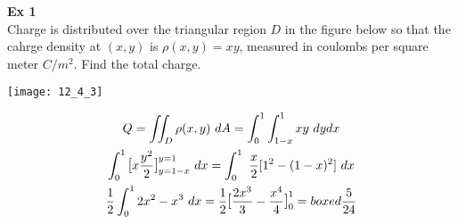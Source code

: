 \documentclass{article}
\begin{document}
   \textbf{Ex 1}\\
   Charge is distributed over the triangular region $ D $ in the figure below so that the cahrge density at $ (x,y) $ is $ \rho(x,y)=xy $, measured in coulombs per square meter $ C/m^{2} $. Find the total charge.

   \begin{center}
       \texttt{[image: 12\_4\_3]}
   \end{center}

   \[
       \begin{gathered}
       Q = \iint_D \rho(x,y) ~dA = \int^{1}_{0} \int^{1}_{1-x} xy ~ dydx\\
       \int^{1}_{0} \text{\large{[}} x\frac{y^{2}}{2}  \text{\large{]}}^{y=1}_{y=1-x}~dx = \int^{1}_{0} ~ \frac{x}{2}  [1^{2}-(1-x)^{2} ]~dx\\
     \frac{1}{2} \int^{1}_{0} 2x^{2}-x^{3} ~dx=\frac{1}{2} \text{\large{[}} \frac{2x^{3}}{3}-\frac{x^{4}}{4} \text{\large{]}}^{1}_{0}=boxed{\frac{5}{24}}  
       \end{gathered}
   \]



   
    
\end{document}
